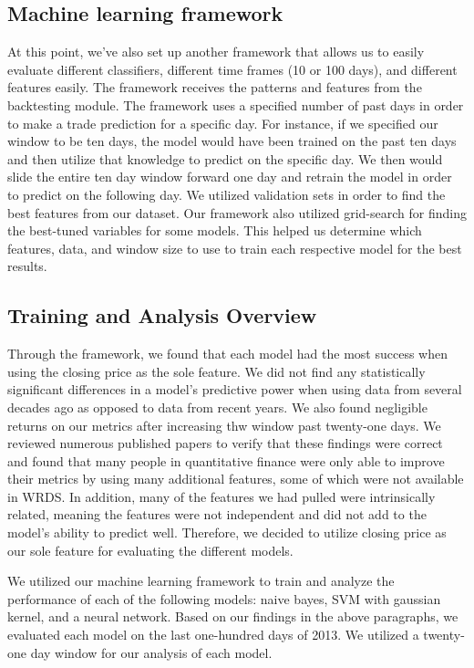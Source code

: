 \documentclass{article}
\begin{document}
\subsection{Machine learning framework}
At this point, we've also set up another framework that allows us to easily evaluate different classifiers, different time frames (10 or 100 days), and different features easily. The framework receives the patterns and features from the backtesting module. The framework uses a specified number of past days in order to make a trade prediction for a specific day. For instance, if we specified our window to be ten days, the model would have been trained on the past ten days and then utilize that knowledge to predict on the specific day. We then would slide the entire ten day window forward one day and retrain the model in order to predict on the following day. We utilized validation sets in order to find the best features from our dataset. Our framework also utilized grid-search for finding the best-tuned variables for some models. This helped us determine which features, data, and window size to use to train each respective model for the best results.

\subsection{Training and Analysis Overview}
Through the framework, we found that each model had the most success when using the closing price as the sole feature. We did not find any statistically significant differences in a model's predictive power when using data from several decades ago as opposed to data from recent years. We also found negligible returns on our metrics after increasing thw window past twenty-one days. We reviewed numerous published papers to verify that these findings were correct and found that many people in quantitative finance were only able to improve their metrics by using many additional features, some of which were not available in WRDS. In addition, many of the features we had pulled were intrinsically related, meaning the features were not independent and did not add to the model's ability to predict well. Therefore, we decided to utilize closing price as our sole feature for evaluating the different models.

We utilized our machine learning framework to train and analyze the performance of each of the following models: naive bayes, SVM with gaussian kernel, and a neural network. Based on our findings in the above paragraphs, we evaluated each model on the last one-hundred days of 2013. We utilized a twenty-one day window for our analysis of each model.
\end{document}
